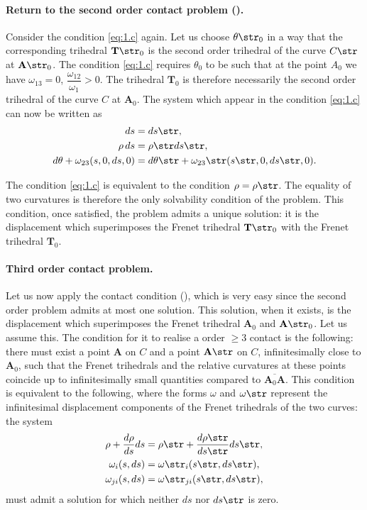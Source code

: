 \paragraph{Return to the second order contact problem ().}
\label{sec:19}
Consider the condition \eqref{eq:1.c} again. Let us choose $\theta\str_{0}$ in a way that the corresponding trihedral $\mathbf{T}\str_{0}$ is the second order trihedral of the curve $C\str$ at $\mathbf{A}\str_{0}$. The condition \eqref{eq:1.c} requires $\theta_{0}$ to be such that at the point $A_{0}$ we have $\omega_{13}=0$, $\dfrac{\omega_{12}}{\omega_{1}}>0$. The trihedral $\mathbf{T}_{0}$ is therefore necessarily the second order trihedral of the curve $C$ at $\mathbf{A}_{0}$. The system which appear in the condition \eqref{eq:1.c} can now be written as
\begin{align*}
  ds&=ds\str,\\
  \rho\,ds&=\rho\str ds\str,\\
  d\theta+\omega_{23}(s,0,ds,0)&=d\theta\str+\omega_{23}\str(s\str,0,ds\str,0).
\end{align*}

The condition \eqref{eq:1.c} is equivalent to the condition $\rho=\rho\str$. The equality of two curvatures is therefore the only solvability condition of the problem. This condition, once satisfied, the problem admits a unique solution: it is the displacement which superimposes the Frenet trihedral $\mathbf{T}\str_{0}$ with the Frenet trihedral $\mathbf{T}_{0}$.

\paragraph{Third order contact problem.}
\label{sec:20}
Let us now apply the contact condition (), which is very easy since the second order problem admits at most one solution. This solution, when it exists, is the displacement which superimposes the Frenet trihedral $\mathbf{A}_{0}$ and $\mathbf{A}\str_{0}$. Let us assume this. The condition for it to realise a order $\ge 3$ contact is the following: there must exist a point $\mathbf{A}$ on $C$ and a point $\mathbf{A}\str$ on $C$, infinitesimally close to $\mathbf{A}_{0}$, such that the Frenet trihedrals and the relative curvatures at these points coincide up to infinitesimally small quantities compared to $\overline{\mathbf{A}_{0}\mathbf{A}}$. This condition is equivalent to the following, where the forms $\omega$ and $\omega\str$ represent the infinitesimal displacement components of the Frenet trihedrals of the two curves: the system
\begin{align*}
  \rho+\frac{d\rho}{ds}ds&=\rho\str+\frac{d\rho\str}{ds\str}ds\str,\\
  \omega_{i}(s,ds)&=\omega\str_{i}(s\str,ds\str),\\
  \omega_{ji}(s,ds)&=\omega\str_{ji}(s\str,ds\str),
\end{align*}
must admit a solution for which neither $ds$ nor $ds\str$ is zero.


